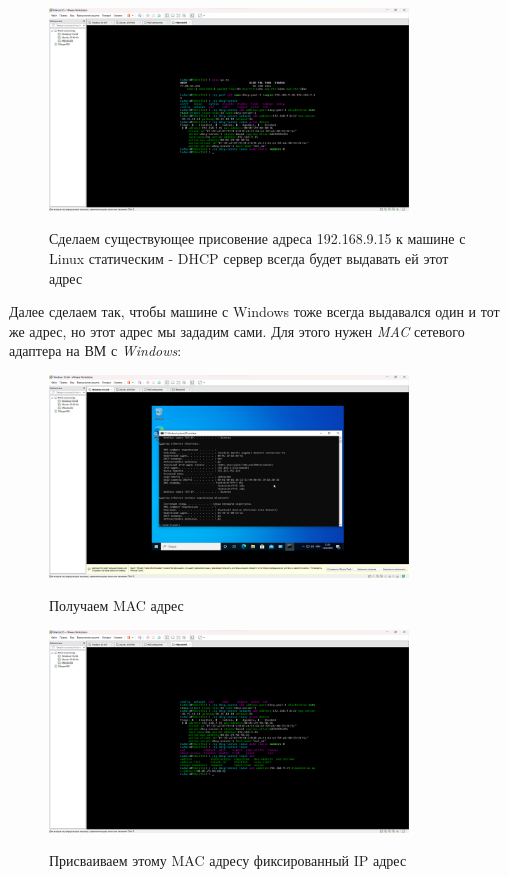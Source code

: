 \documentclass[a4paper]{article}
\begin{document}
  \begin{figure}[H]
    \centering
    \includegraphics[width=0.85\textwidth]{06_00 (108)}
    \label{img:108}
    \caption{Сделаем существующее присовение адреса 192.168.9.15 к машине с Linux статическим - DHCP сервер всегда будет выдавать ей этот адрес}
  \end{figure}
  
  Далее сделаем так, чтобы машине с Windows тоже всегда выдавался один и тот же адрес,
  но этот адрес мы зададим сами. Для этого нужен \textit{MAC} сетевого адаптера на 
  ВМ с \textit{Windows}:

  \begin{figure}[H]
    \centering
    \includegraphics[width=0.85\textwidth]{06_00 (109)}
    \label{img:109}
    \caption{Получаем MAC адрес}
  \end{figure}
  
  \begin{figure}[H]
    \centering
    \includegraphics[width=0.85\textwidth]{06_00 (110)}
    \label{img:110}
    \caption{Присваиваем этому MAC адресу фиксированный IP адрес}
  \end{figure}
  
\end{document}
